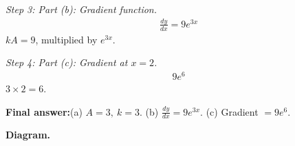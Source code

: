 \documentclass[11pt]{article}
\begin{document}
\textit{Step 3: Part (b): Gradient function.}
\[\begin{gathered}
\frac{dy}{dx} = 9e^{3x}
\end{gathered}\]
\( kA = 9 \), multiplied by \( e^{3x} \).

\textit{Step 4: Part (c): Gradient at \( x = 2 \).}
\[\begin{gathered}
9e^{6}
\end{gathered}\]
\( 3 \times 2 = 6 \).

\begin{answerbox}
\textbf{Final answer:}\quad (a) \(\displaystyle  A = 3,\ k = 3 \). (b) \(\displaystyle  \frac{dy}{dx} = 9e^{3x} \). (c) Gradient \(\displaystyle  = 9e^6 \).
\end{answerbox}
\textbf{Diagram.}

\begin{center}
\end{center}
\end{document}

